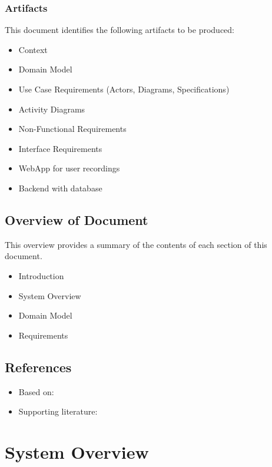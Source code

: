 \subsubsection{Artifacts}

This document identifies the following artifacts to be produced:

\begin{itemize}
    \item Context
    \item Domain Model
    \item Use Case Requirements (Actors, Diagrams, Specifications)
    \item Activity Diagrams
    \item Non-Functional Requirements
    \item Interface Requirements
    \item WebApp for user recordings
    \item Backend with database
\end{itemize}

\subsection{Overview of Document}

This overview provides a summary of the contents of each section of this document.

\begin{itemize}
    \item Introduction
    \item System Overview
    \item Domain Model
    \item Requirements
\end{itemize}

\subsection{References}

\begin{itemize}
    \item Based on: \cite{naoufel2014requirements}
    \item Supporting literature: \cite{pressman2014software}
\end{itemize}

\section{System Overview}

